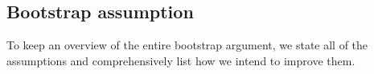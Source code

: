 \documentclass[11pt,leqno,textwidth=10cm]{amsart}
\numberwithin{equation}{section}
\theoremstyle{definition}
\theoremstyle{plain}
\newcommand{\1}{\mathbbm{1}}
\newcommand{\del}{\partial}
\begin{document}



\subsection{Bootstrap assumption}\label{subsec:bs}

To keep an overview of the entire bootstrap argument, we state all of the assumptions and comprehensively list how we intend to improve them.
\end{document}

